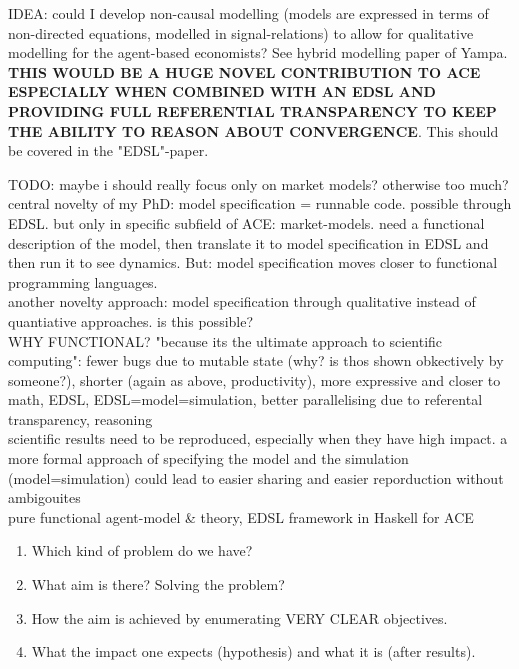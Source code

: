 IDEA: could I develop non-causal modelling (models are expressed in terms of non-directed equations, modelled in signal-relations) to allow for qualitative modelling for the agent-based economists? See hybrid modelling paper of Yampa. \textbf{THIS WOULD BE A HUGE NOVEL CONTRIBUTION TO ACE ESPECIALLY WHEN COMBINED WITH AN EDSL AND PROVIDING FULL REFERENTIAL TRANSPARENCY TO KEEP THE ABILITY TO REASON ABOUT CONVERGENCE}. This should be covered in the "EDSL"-paper.

TODO: maybe i should really focus only on market models? otherwise too much? \\

central novelty of my PhD: model specification = runnable code. possible through EDSL. but only in specific subfield of ACE: market-models. need a functional description of the model, then translate it to model specification in EDSL and then run it to see dynamics. But: model specification moves closer to functional programming languages. \\

another novelty approach: model specification through qualitative instead of quantiative approaches. is this possible? \\

WHY FUNCTIONAL? "because its the ultimate approach to scientific computing": fewer bugs due to mutable state (why? is thos shown obkectively by someone?), shorter (again as above, productivity), more expressive and closer to math, EDSL, EDSL=model=simulation, better parallelising due to referental transparency, reasoning \\

scientific results need to be reproduced, especially when they have high impact. a more formal approach of specifying the model and the simulation (model=simulation) could lead to easier sharing and easier reporduction without ambigouites \\

pure functional agent-model \& theory, EDSL framework in Haskell for ACE

\begin{enumerate}
\item Which kind of problem do we have?
\item What aim is there? Solving the problem? 
\item How the aim is achieved by enumerating VERY CLEAR objectives.
\item What the impact one expects (hypothesis) and what it is (after results).
\end{enumerate}

